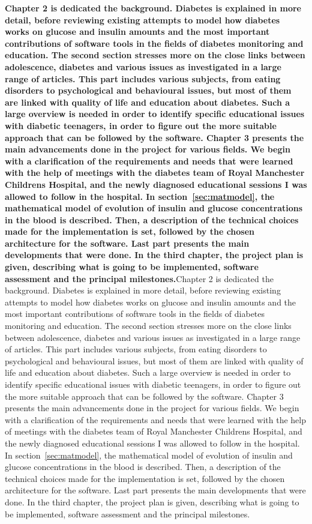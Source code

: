 \documentclass[12pt,MSc]{muthesis}
\newcommand{\warn}[1]{\ifdefined\debug\textbf{#1}\else#1\fi}
\begin{document}
\warn{Chapter 2 is dedicated the background. Diabetes is explained in more detail, before reviewing existing attempts to model how diabetes works on glucose and insulin amounts and the most important contributions of software tools in the fields of diabetes monitoring and education. The second section stresses more on the close links between adolescence, diabetes and various issues as investigated in a large range of articles. This part includes various subjects, from eating disorders to psychological and behavioural issues, but most of them are linked with quality of life and education about diabetes. Such a large overview is needed in order to identify specific educational issues with diabetic teenagers, in order to figure out the more suitable approach that can be followed by the software. 
Chapter 3 presents the main advancements done in the project for various fields. We begin with a clarification of the requirements and needs that were learned with the help of meetings with the diabetes team of Royal Manchester Childrens Hospital, and the newly diagnosed educational sessions I was allowed to follow in the hospital. In section~\ref{sec:matmodel}, the mathematical model of evolution of insulin and glucose concentrations in the blood is described. Then, a description of the technical choices made for the implementation is set, followed by the chosen architecture for the software. Last part presents the main developments that were done.
In the third chapter, the project plan is given, describing what is going to be implemented, software assessment and the principal milestones.}







%



\end{document}
